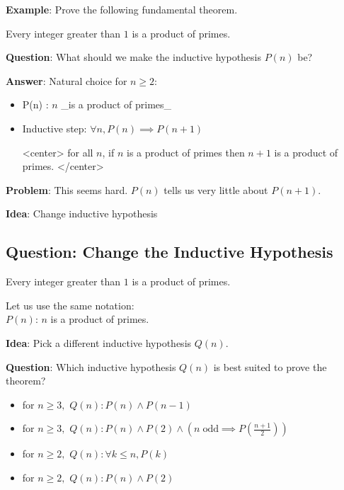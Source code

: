 \documentclass[11pt]{article}
\begin{document}
 \textbf{Example}: Prove the following fundamental theorem.
 
 \begin{theorem}
 Every integer greater than $1$ is a product of primes.
 \end{theorem}
 
     \textbf{Question}: What should we make the inductive hypothesis \(P(n)\)
 be?
 
     \textbf{Answer}: Natural choice for \(n \geq 2\):
 
 \begin{itemize}
 \item P(n)  : $n$ _is a product of primes_
 
 \item Inductive step: $\forall n, P(n) \implies P(n+1)$
 
 <center>
 for all $n$, if $n$ is a product of primes then $n+1$ is a product of primes.
 </center>        
 \end{itemize}
 
     \textbf{Problem}: This seems hard. \(P(n)\) tells us very little about
 \(P(n+1)\).
 
     \textbf{Idea}: Change inductive hypothesis
 
     \subsection{Question: Change the Inductive
 Hypothesis}\label{question-change-the-inductive-hypothesis}
 
 \begin{theorem}
 Every integer greater than $1$ is a product of primes.
 \end{theorem}
 
 Let us use the same notation:\\
 
 \(P(n)\): \(n\) is a product of primes.
 
 \textbf{Idea}: Pick a different inductive hypothesis \(Q(n)\).
 
     \textbf{Question}: Which inductive hypothesis \(Q(n)\) is best suited to
 prove the theorem?
 
 \begin{itemize}
 \item for $n \geq 3,$  
 $Q(n): P(n) \land P(n-1)$
 
 \item for $n \geq 3,$    
 $Q(n): P(n) \land P(2) \land (n \;\textrm{odd} \implies P\left(\frac{n+1}{2}\right))$
 
 \item for $n \geq 2,$  
 $Q(n): \forall k \leq n, P(k)$
 
 \item for $n \geq 2,$  
 $Q(n): P(n) \land P(2)$
 \end{itemize}
 
\end{document}
